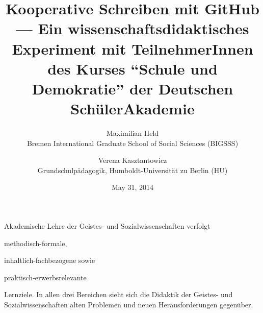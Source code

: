 \documentclass[11pt,a4paper,oneside]{article}
\title{
	Kooperative Schreiben mit GitHub ---
	Ein wissenschaftsdidaktisches Experiment mit TeilnehmerInnen des Kurses ``Schule und Demokratie'' der Deutschen SchülerAkademie
}
\date{May 31, 2014}
\author{
	Maximilian Held\\
	Bremen International Graduate School of Social Sciences (BIGSSS)
	\and
	Verena Kasztantowicz\\
	Grundschulpädagogik, Humboldt-Universität zu Berlin (HU)
}
\begin{document}
\maketitle




Akademische Lehre der Geistes- und Sozialwissenschaften verfolgt
\begin{inparaenum}
	\item methodisch-formale,
	\item inhaltlich-fachbezogene sowie
	\item praktisch-erwerbsrelevante
\end{inparaenum}
Lernziele.
In allen drei Bereichen sieht sich die Didaktik der Geistes- und Sozialwissenschaften alten Problemen und neuen Herausforderungen gegenüber.
\end{document}
